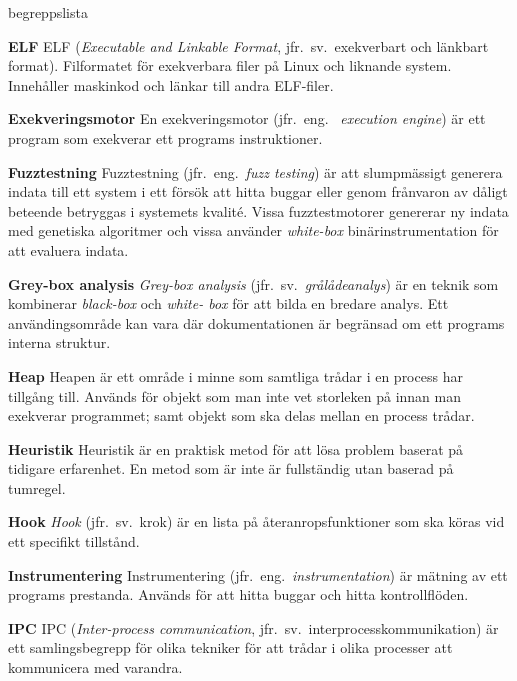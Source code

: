 \begin{labeling}{begreppslista}
    \item [\textbf{ELF}] ELF (\emph{Executable and Linkable Format}, jfr.\ sv.\
    exekverbart och länkbart format). Filformatet för exekverbara filer
    på Linux och liknande system. Innehåller maskinkod och länkar till andra
    ELF-filer.

    \item [\textbf{Exekveringsmotor}] En exekveringsmotor (jfr.\ eng.
    \ \emph{execution engine}) är ett program som exekverar ett programs
    instruktioner.

    \item [\textbf{Fuzztestning}] Fuzztestning (jfr.\ eng.\ \emph{fuzz testing})
    är att slumpmässigt generera indata till ett system i ett försök att hitta
    buggar eller genom frånvaron av dåligt beteende betryggas i systemets
    kvalité. Vissa fuzztestmotorer genererar ny indata med genetiska algoritmer
    och vissa använder \emph{white-box} binärinstrumentation för att evaluera indata.

    \item [\textbf{Grey-box analysis}] \emph{Grey-box analysis} (jfr.\ sv.\
    \emph{grålådeanalys}) är en teknik som kombinerar \emph{black-box} och \emph{white-
        box} för att bilda en bredare analys. Ett användingsområde kan vara där
    dokumentationen är begränsad om ett programs interna struktur.

    \item [\textbf{Heap}] Heapen är ett område i minne som samtliga trådar i
    en process har tillgång till. Används för objekt som man inte vet storleken på
    innan man exekverar programmet; samt objekt som ska delas mellan en process
    trådar.

    \item [\textbf{Heuristik}] Heuristik är en praktisk metod för att lösa
    problem baserat på tidigare erfarenhet. En metod som är inte är fullständig
    utan baserad på tumregel.

    \item [\textbf{Hook}] \emph{Hook} (jfr.\ sv.\ krok) är en lista på återanropsfunktioner
    som ska köras vid ett specifikt tillstånd.

    \item [\textbf{Instrumentering}] Instrumentering (jfr.\ eng.\
    \emph{instrumentation}) är mätning av ett programs prestanda. Används för
    att hitta buggar och hitta kontrollflöden.

    \item [\textbf{IPC}] IPC (\emph{Inter-process communication}, jfr.\ sv.\
    interprocesskommunikation) är ett samlingsbegrepp för olika tekniker
    för att trådar i olika processer att kommunicera med varandra.


\end{labeling}
